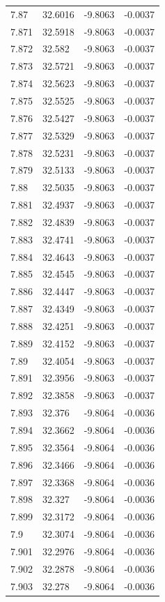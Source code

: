 \begin{tabular}{llll}
7.87 & 32.6016 & -9.8063 & -0.0037 \\
7.871 & 32.5918 & -9.8063 & -0.0037 \\
7.872 & 32.582 & -9.8063 & -0.0037 \\
7.873 & 32.5721 & -9.8063 & -0.0037 \\
7.874 & 32.5623 & -9.8063 & -0.0037 \\
7.875 & 32.5525 & -9.8063 & -0.0037 \\
7.876 & 32.5427 & -9.8063 & -0.0037 \\
7.877 & 32.5329 & -9.8063 & -0.0037 \\
7.878 & 32.5231 & -9.8063 & -0.0037 \\
7.879 & 32.5133 & -9.8063 & -0.0037 \\
7.88 & 32.5035 & -9.8063 & -0.0037 \\
7.881 & 32.4937 & -9.8063 & -0.0037 \\
7.882 & 32.4839 & -9.8063 & -0.0037 \\
7.883 & 32.4741 & -9.8063 & -0.0037 \\
7.884 & 32.4643 & -9.8063 & -0.0037 \\
7.885 & 32.4545 & -9.8063 & -0.0037 \\
7.886 & 32.4447 & -9.8063 & -0.0037 \\
7.887 & 32.4349 & -9.8063 & -0.0037 \\
7.888 & 32.4251 & -9.8063 & -0.0037 \\
7.889 & 32.4152 & -9.8063 & -0.0037 \\
7.89 & 32.4054 & -9.8063 & -0.0037 \\
7.891 & 32.3956 & -9.8063 & -0.0037 \\
7.892 & 32.3858 & -9.8063 & -0.0037 \\
7.893 & 32.376 & -9.8064 & -0.0036 \\
7.894 & 32.3662 & -9.8064 & -0.0036 \\
7.895 & 32.3564 & -9.8064 & -0.0036 \\
7.896 & 32.3466 & -9.8064 & -0.0036 \\
7.897 & 32.3368 & -9.8064 & -0.0036 \\
7.898 & 32.327 & -9.8064 & -0.0036 \\
7.899 & 32.3172 & -9.8064 & -0.0036 \\
7.9 & 32.3074 & -9.8064 & -0.0036 \\
7.901 & 32.2976 & -9.8064 & -0.0036 \\
7.902 & 32.2878 & -9.8064 & -0.0036 \\
7.903 & 32.278 & -9.8064 & -0.0036 \\

\end{tabular}
